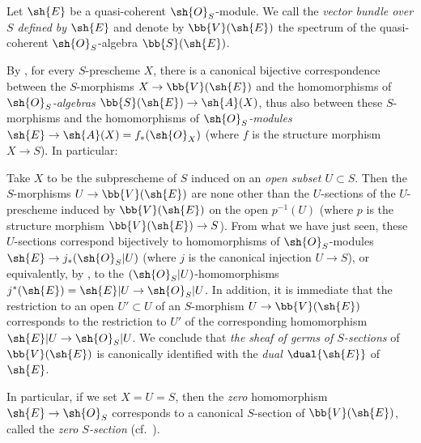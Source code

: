 \begin{definition}[1.7.8]
\label{II.1.7.8}
Let $\sh{E}$ be a quasi-coherent $\sh{O}_S$-module.
We call the \emph{vector bundle over $S$ defined by $\sh{E}$} and denote by $\bb{V}(\sh{E})$ the spectrum  of the quasi-coherent $\sh{O}_S$-algebra $\bb{S}(\sh{E})$.
\end{definition}

By , for every $S$-prescheme $X$, there is a canonical bijective correspondence between the $S$-morphisms $X\to\bb{V}(\sh{E})$ and the homomorphisms of \emph{$\sh{O}_S$-algebras $\bb{S}(\sh{E})\to\sh{A}(X)$}, thus also between these $S$-morphisms and the homomorphisms of \emph{$\sh{O}_S$-modules $\sh{E}\to\sh{A}(X)=f_*(\sh{O}_X)$} (where $f$ is the structure morphism $X\to S$).
In particular:
\begin{env}[1.7.9]
\label{II.1.7.9}
Take $X$ to be the subprescheme of $S$ induced on an \emph{open subset $U\subset S$}.
Then the $S$-morphisms $U\to\bb{V}(\sh{E})$ are none other than the $U$-sections  of the $U$-prescheme induced by $\bb{V}(\sh{E})$ on the open $p^{-1}(U)$ (where $p$ is the structure morphism $\bb{V}(\sh{E})\to S$).
From what we have just seen, these $U$-sections correspond bijectively to homomorphisms of $\sh{O}_S$-modules $\sh{E}\to j_*(\sh{O}_S|U)$ (where $j$ is the canonical injection $U\to S$), or
equivalently, by , to the $(\sh{O}_S|U)$-homomorphisms $j^*(\sh{E})=\sh{E}|U\to\sh{O}_S|U$.
In addition, it is immediate that the restriction to an open $U'\subset U$ of an $S$-morphism $U\to\bb{V}(\sh{E})$ corresponds to the restriction to $U'$ of the corresponding homomorphism $\sh{E}|U\to\sh{O}_S|U$.
We conclude that \emph{the sheaf of germs of $S$-sections} of $\bb{V}(\sh{E})$ is canonically identified with the \emph{dual $\dual{\sh{E}}$} of $\sh{E}$.

In particular, if we set $X=U=S$, then the \emph{zero} homomorphism $\sh{E}\to\sh{O}_S$ corresponds to a canonical $S$-section of $\bb{V}(\sh{E})$, called the \emph{zero $S$-section} (cf.~).
\end{env}

